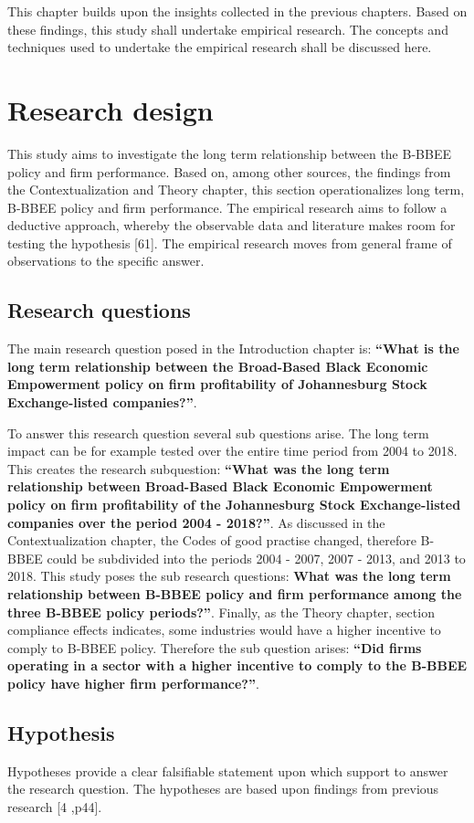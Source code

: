 This chapter builds upon the insights collected in the previous chapters. Based on these findings, this study shall undertake empirical research. The concepts and techniques used to undertake the empirical research shall be discussed here. 
\section{Research design}
This study aims to investigate the long term relationship between the B-BBEE policy and firm performance. Based on, among other sources, the findings from the Contextualization and Theory chapter, this section operationalizes long term, B-BBEE policy and firm performance. The empirical research aims to follow a deductive approach, whereby the observable data and literature makes room for testing the hypothesis [61]. The empirical research moves from general frame of observations to the specific answer.  
\subsection{Research questions}
The main research question posed in the Introduction chapter is: \textbf{“What is the long term relationship between the Broad-Based Black Economic Empowerment policy on firm profitability of Johannesburg Stock Exchange-listed companies?”}.

To answer this research question several sub questions arise. The long term impact can be for example tested over the entire time period from 2004 to 2018. This creates the research subquestion: \textbf{“What was the long term relationship between Broad-Based Black Economic Empowerment policy on firm profitability of the Johannesburg Stock Exchange-listed companies over the period 2004 - 2018?”}. As discussed in the Contextualization chapter, the Codes of good practise changed, therefore B-BBEE could be subdivided into the periods 2004 - 2007, 2007 - 2013, and 2013 to 2018. This study poses the sub research questions: \textbf{What was the long term relationship between B-BBEE policy and firm performance among the three B-BBEE policy periods?”}. Finally, as the Theory chapter, section compliance effects indicates, some industries would have a higher incentive to comply to B-BBEE policy. Therefore the sub question arises: \textbf{“Did firms operating in a sector with a higher incentive to comply to the B-BBEE policy have higher firm performance?”}.
\subsection{Hypothesis}
Hypotheses provide a clear falsifiable statement upon which support to answer the research question. The hypotheses are based upon findings from previous research [4 ,p44].

